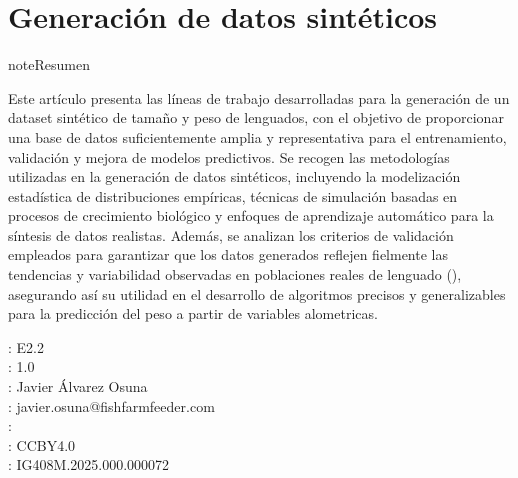 \documentclass[a4paper,10pt,spanish]{jupyterBook}
\begin{document}
\chapter{Generación de datos sintéticos}
\label{\detokenize{content/02/Generador:generacion-de-datos-sinteticos}}\label{\detokenize{content/02/Generador::doc}}
\begin{sphinxadmonition}{note}{Resumen}

\sphinxAtStartPar
Este artículo presenta las líneas de trabajo desarrolladas para la generación de un dataset sintético de tamaño y peso de lenguados, con el objetivo de proporcionar una base de datos suficientemente amplia y representativa para el entrenamiento, validación y mejora de modelos predictivos. Se recogen las metodologías utilizadas en la generación de datos sintéticos, incluyendo la modelización estadística de distribuciones empíricas, técnicas de simulación basadas en procesos de crecimiento biológico y enfoques de aprendizaje automático para la síntesis de datos realistas. Además, se analizan los criterios de validación empleados para garantizar que los datos generados reflejen fielmente las tendencias y variabilidad observadas en poblaciones reales de lenguado (), asegurando así su utilidad en el desarrollo de algoritmos precisos y generalizables para la predicción del peso a partir de variables alometricas.

\sphinxAtStartPar
{}: E2.2\\
: 1.0\\
: Javier Álvarez Osuna\\
: javier.osuna@fishfarmfeeder.com\\
: \\
: CC\sphinxhyphen{}BY\sphinxhyphen{}4.0\\
: IG408M.2025.000.000072

\end{sphinxadmonition}
\end{document}

